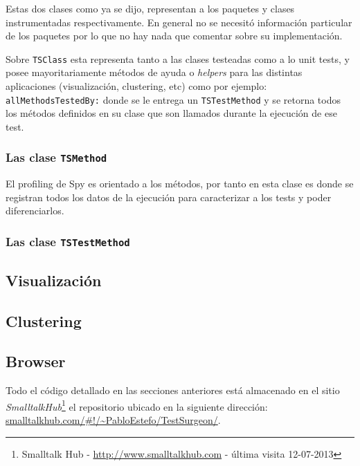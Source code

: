\par Estas dos clases como ya se dijo, representan a los paquetes y clases instrumentadas respectivamente. En general no se necesitó información particular de los paquetes por lo que no hay nada que comentar sobre su implementación.

\par Sobre {\tt TSClass} esta representa tanto a las clases testeadas como a lo unit tests, y posee mayoritariamente métodos de ayuda o \emph{helpers} para las distintas aplicaciones (visualización, clustering, etc) como por ejemplo: {\tt allMethodsTestedBy:} donde se le entrega un {\tt TSTestMethod} y se retorna todos los métodos definidos en su clase que son llamados durante la ejecución de ese test.  

\subsubsection{Las clase {\tt TSMethod} }
\par El profiling de Spy es orientado a los métodos, por tanto en esta clase es donde se registran todos los datos de la ejecución para caracterizar a los tests y poder diferenciarlos.
\par 

\subsubsection{Las clase {\tt TSTestMethod} }

\subsection{Visualización}

\subsection{Clustering}

\subsection{Browser}


\par Todo el código detallado en las secciones anteriores está almacenado en el sitio \emph{SmalltalkHub}\footnote{Smalltalk Hub - \url{http://www.smalltalkhub.com} - última visita 12-07-2013 } el repositorio ubicado en la siguiente dirección: \url{smalltalkhub.com/#!/~PabloEstefo/TestSurgeon/}. 